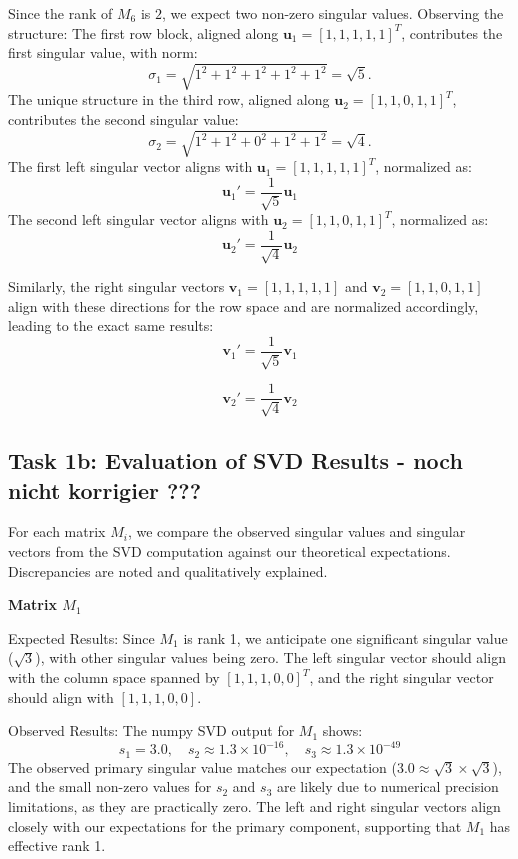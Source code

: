 \documentclass[a4paper,oneside,bibliography=totoc]{scrartcl}
\begin{document}
Since the rank of \( M_6 \) is \( 2 \), we expect two non-zero singular values. Observing the structure:
The first row block, aligned along \( \mathbf{u}_1 = [1, 1, 1, 1, 1]^T \), contributes the first singular value, with norm:
   \[
   \sigma_1 = \sqrt{1^2 + 1^2 + 1^2 + 1^2 + 1^2} = \sqrt{5}.
   \]
The unique structure in the third row, aligned along \( \mathbf{u}_2 = [1, 1, 0, 1, 1]^T \), contributes the second singular value:
   \[
   \sigma_2 = \sqrt{1^2 + 1^2 + 0^2 + 1^2 + 1^2} = \sqrt{4}.
   \]
The first left singular vector aligns with \( \mathbf{u}_1 = [1, 1, 1, 1, 1]^T \), normalized as:
   \[
   \mathbf{u}_1' = \frac{1}{\sqrt{5}} \mathbf{u}_1
   \]
The second left singular vector aligns with \( \mathbf{u}_2 = [1, 1, 0, 1, 1]^T \), normalized as:
   \[
   \mathbf{u}_2' = \frac{1}{\sqrt{4}} \mathbf{u}_2
   \]

Similarly, the right singular vectors \( \mathbf{v}_1 = [1, 1, 1, 1, 1]\) and \( \mathbf{v}_2 = [1, 1, 0, 1, 1]\) align with these directions for the row space and are normalized accordingly, leading to the exact same results:
\[
\mathbf{v}_1' = \frac{1}{\sqrt{5}} \mathbf{v}_1
\]

\[
\mathbf{v}_2' = \frac{1}{\sqrt{4}} \mathbf{v}_2
\]

\subsection{Task 1b:  Evaluation of SVD Results - noch nicht korrigier ???}

For each matrix \( M_i \), we compare the observed singular values and singular vectors from the SVD computation against our theoretical expectations. Discrepancies are noted and qualitatively explained.

\textbf{Matrix \( M_1 \)}

Expected Results: Since \( M_1 \) is rank 1, we anticipate one significant singular value (\( \sqrt{3} \)), with other singular values being zero. The left singular vector should align with the column space spanned by \( [1, 1, 1, 0, 0]^T \), and the right singular vector should align with \( [1, 1, 1, 0, 0] \).

Observed Results: The numpy SVD output for \( M_1 \) shows:
\[
s_1 = 3.0, \quad s_2 \approx 1.3 \times 10^{-16}, \quad s_3 \approx 1.3 \times 10^{-49}
\]
The observed primary singular value matches our expectation (\(3.0 \approx \sqrt{3} \times \sqrt{3} \)), and the small non-zero values for \( s_2 \) and \( s_3 \) are likely due to numerical precision limitations, as they are practically zero. The left and right singular vectors align closely with our expectations for the primary component, supporting that \( M_1 \) has effective rank 1.
\end{document}
